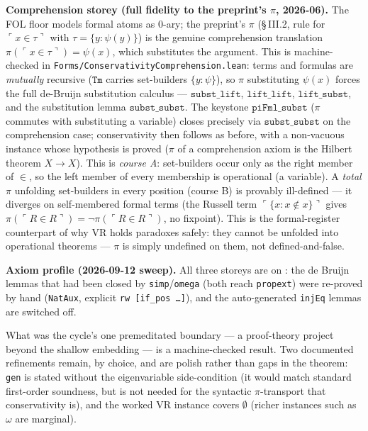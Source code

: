 \begin{theorem}
\textbf{Comprehension storey (full fidelity to the preprint's $\pi$, 2026-06).}  The FOL floor
models formal atoms as $0$-ary; the preprint's $\pi$ (\S\,III.2, rule for $\ulcorner x\in\tau\urcorner$
with $\tau=\{y:\psi(y)\}$) is the genuine comprehension translation $\pi(\ulcorner x\in\tau\urcorner)=\psi(x)$,
which substitutes the argument.  This is machine-checked in
\texttt{Forms/ConservativityComprehension.lean}: terms and formulas are \emph{mutually} recursive
($\mathtt{Tm}$ carries set-builders $\{y:\psi\}$), so $\pi$ substituting $\psi(x)$ forces the full
de-Bruijn substitution calculus --- $\mathtt{subst\_lift}$, $\mathtt{lift\_lift}$,
$\mathtt{lift\_subst}$, and the substitution lemma $\mathtt{subst\_subst}$.
The keystone $\mathtt{piFml\_subst}$ ($\pi$ commutes with substituting a variable) closes precisely
via $\mathtt{subst\_subst}$ on the comprehension case; conservativity then follows as before, with a
non-vacuous instance whose hypothesis is proved ($\pi$ of a comprehension axiom is the Hilbert theorem
$X\to X$).  This is \emph{course A}: set-builders occur only as the right member of $\in$, so the left
member of every membership is operational (a variable).  A \emph{total} $\pi$ unfolding set-builders in
every position (course B) is provably ill-defined --- it diverges on self-membered formal terms (the
Russell term $\ulcorner\{x:x\notin x\}\urcorner$ gives $\pi(\ulcorner R\in R\urcorner)=\lnot\pi(\ulcorner R\in R\urcorner)$,
no fixpoint).  This is the formal-register counterpart of why VR holds paradoxes safely: they cannot be
unfolded into operational theorems --- $\pi$ is simply undefined on them, not defined-and-false.

\textbf{Axiom profile (2026-09-12 sweep).}  All three storeys are on \axiomprofile{[]}: the de Bruijn
lemmas that had been closed by \texttt{simp}/\texttt{omega} (both reach \texttt{propext}) were
re-proved by hand (\texttt{NatAux}, explicit \texttt{rw [if\_pos …]}), and the auto-generated
\texttt{injEq} lemmas are switched off.

\begin{remark}
\label{rem:conservativity_boundary}
What was the cycle's one premeditated boundary --- a proof-theory project beyond the shallow
embedding --- is a machine-checked result.  Two documented refinements remain, by choice,
and are polish rather than gaps in the theorem: \texttt{gen} is stated without the eigenvariable
side-condition (it would match standard first-order soundness, but is not needed for the
syntactic $\pi$-transport that conservativity is), and the worked VR instance covers $\emptyset$
(richer instances such as $\omega$ are marginal).
\end{remark}
\end{theorem}

